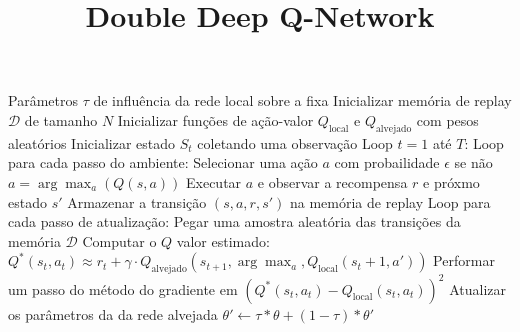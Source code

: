 \documentclass[brazilian,preview]{standalone}
\title{Double Deep Q-Network}
\begin{document}
\begin{algorithm}
Parâmetros $\tau$ de influência da rede local sobre a fixa
Inicializar memória de replay $\mathcal{D}$ de tamanho $N$
Inicializar funções de ação-valor $Q_{\mathrm{local}}$ e $Q_{\mathrm{alvejado}}$ com pesos aleatórios
Inicializar estado $S_t$ coletando uma observação
Loop $t = 1$ até $T$:
    Loop para cada passo do ambiente:
        Selecionar uma ação $a$ com probailidade $\epsilon$ se não $a = \arg\max_a(Q(s,a))$
        Executar $a$ e observar a recompensa $r$ e próxmo estado $s'$
        Armazenar a transição $(s,a,r,s')$ na memória de replay
    Loop para cada passo de atualização:
        Pegar uma amostra aleatória das transições da memória $\mathcal{D}$
        Computar o $Q$ valor estimado:
            $Q^*(s_t,a_t) \approx r_t + \gamma \cdot Q_{\mathrm{alvejado}}(s_{t+1}, \arg\max_a, Q_{\mathrm{local}}(s_t+1,a'))$
        Performar um passo do método do gradiente em $(Q^*(s_t,a_t) - Q_{\mathrm{local}}(s_t,a_t))^2$
        Atualizar os parâmetros da da rede alvejada
            $\theta' \leftarrow \tau * \theta + (1-\tau) * \theta'$

\end{algorithm}
\end{document}
